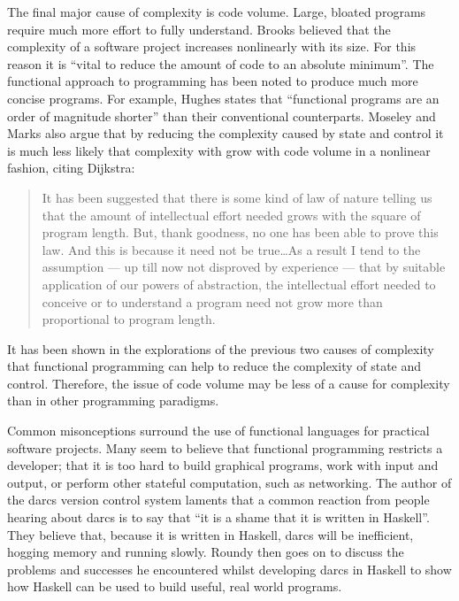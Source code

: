 The final major cause of complexity is code volume. Large, bloated programs
require much more effort to fully understand. Brooks believed that the complexity
of a software project increases nonlinearly with its size.\cite{brooks1987bullet}
For this reason it is ``vital to reduce the amount of code to an absolute
minimum''.\cite{moseley2006tarpit} The functional approach to programming
has been noted to produce much more concise programs. For example, Hughes
states that ``functional programs are an order of magnitude shorter'' than
their conventional counterparts.\cite{hughes1989whyfp} Moseley and Marks
also argue that by reducing the complexity caused by state and control it
is much less likely that complexity with grow with code volume in a nonlinear
fashion, citing Dijkstra:\cite{dijkstra1972humble}

\begin{quote}
It has been suggested that there is some kind of law of nature telling us that
the amount of intellectual effort needed grows with the square of program length.
But, thank goodness, no one has been able to prove this law. And this is because
it need not be true\ldots As a result I tend to the assumption --- up till now
not disproved by experience --- that by suitable application of our powers of
abstraction, the intellectual effort needed to conceive or to understand a program
need not grow more than proportional to program length.
\end{quote}
\noindent
It has been shown in the explorations of the previous two causes of complexity
that functional programming can help to reduce the complexity of state and
control. Therefore, the issue of code volume may be less of a cause for complexity
than in other programming paradigms.

Common misonceptions surround the use of functional languages for practical
software projects. Many seem to believe that functional programming restricts
a developer; that it is too hard to build graphical programs, work with input
and output, or perform other stateful computation, such as networking.
The author of the darcs version control system laments that a common reaction
from people hearing about darcs is to say that ``it is a shame that it is
written in Haskell''.\cite{roundy2005darcs} They believe that, because it is
written in Haskell, darcs will be inefficient, hogging memory and running slowly.
Roundy then goes on to discuss the problems and successes he encountered whilst
developing darcs in Haskell to show how Haskell can be used to build useful, real
world programs.

